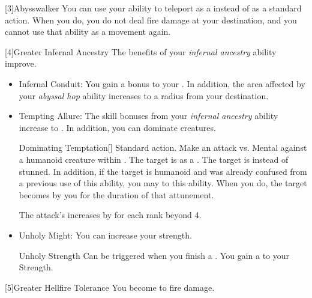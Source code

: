       [3]{Abysswalker} You can use your  ability to teleport as a  instead of as a standard action.
      When you do, you do not deal fire damage at your destination, and you  cannot use that ability as a movement again.

      [4]{Greater Infernal Ancestry} The benefits of your \textit{infernal ancestry} ability improve.
      \begin{itemize}
        \item Infernal Conduit: You gain a  bonus to your .
          In addition, the area affected by your \textit{abyssal hop} ability increases to a \smallarea radius from your destination.
        \item Tempting Allure: The skill bonuses from your \textit{infernal ancestry} ability increase to .
          In addition, you can dominate creatures.
          \begin{magicalactiveability}{Dominating Temptation}[]
            \abilityusagetime Standard action.
            \rankline
            Make an attack vs. Mental against a humanoid creature within \shortrange.
            \hit The target is \stunned as a .
            \crit The target is \confused instead of stunned.
            In addition, if the target is humanoid and was already confused from a previous use of this ability, you may  to this ability.
            When you do, the target becomes \dominated by you for the duration of that attunement.

            \rankline
            \noindent The attack's  increases by  for each rank beyond 4.
          \end{magicalactiveability}
        \item Unholy Might: You can increase your strength.
          \begin{magicalattuneability}{Unholy Strength}{}
            \abilityusagetime Can be triggered when you finish a .
            \rankline
            You gain a   to your Strength.
          \end{magicalattuneability}
      \end{itemize}

    [5]{Greater Hellfire Tolerance} You become  to fire damage.

